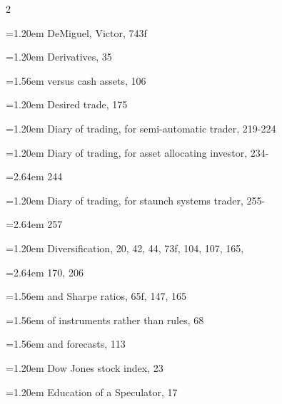 {\begin{multicols}{2}
\par \noindent\hangindent=1.20em\hspace*{0.00em} DeMiguel, Victor, 743f
\par \noindent\hangindent=1.20em\hspace*{0.00em} Derivatives, 35
\par \noindent\hangindent=1.56em\hspace*{0.36em} versus cash assets, 106
\par \noindent\hangindent=1.20em\hspace*{0.00em} Desired trade, 175
\par \noindent\hangindent=1.20em\hspace*{0.00em} Diary of trading, for semi-automatic trader, 219-224
\par \noindent\hangindent=1.20em\hspace*{0.00em} Diary of trading, for asset allocating investor, 234-
\par \noindent\hangindent=2.64em\hspace*{1.44em} 244
\par \noindent\hangindent=1.20em\hspace*{0.00em} Diary of trading, for staunch systems trader, 255-
\par \noindent\hangindent=2.64em\hspace*{1.44em} 257
\par \noindent\hangindent=1.20em\hspace*{0.00em} Diversification, 20, 42, 44, 73f, 104, 107, 165,
\par \noindent\hangindent=2.64em\hspace*{1.44em} 170, 206
\par \noindent\hangindent=1.56em\hspace*{0.36em} and Sharpe ratios, 65f, 147, 165
\par \noindent\hangindent=1.56em\hspace*{0.36em} of instruments rather than rules, 68
\par \noindent\hangindent=1.56em\hspace*{0.36em} and forecasts, 113
\par \noindent\hangindent=1.20em\hspace*{0.00em} Dow Jones stock index, 23
\par \noindent\hangindent=1.20em\hspace*{0.00em} Education of a Speculator, 17

\end{multicols}}
